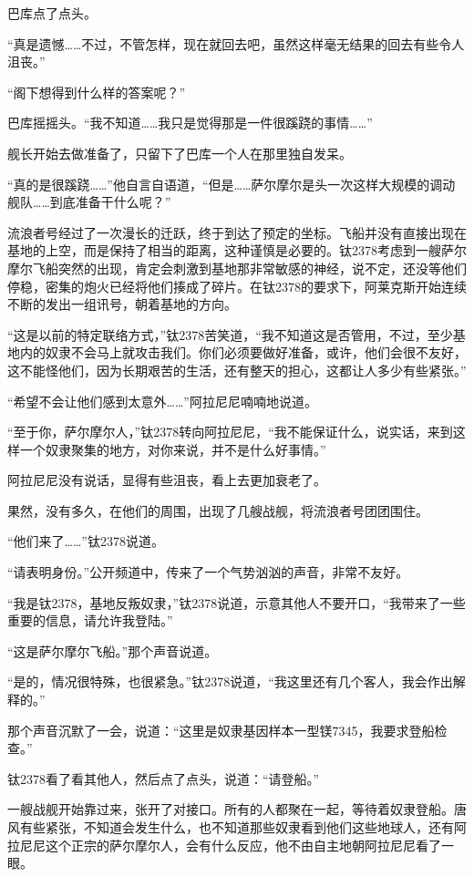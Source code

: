 巴库点了点头。 

“真是遗憾……不过，不管怎样，现在就回去吧，虽然这样毫无结果的回去有些令人沮丧。” 

“阁下想得到什么样的答案呢？” 

巴库摇摇头。“我不知道……我只是觉得那是一件很蹊跷的事情……” 

舰长开始去做准备了，只留下了巴库一个人在那里独自发呆。 

“真的是很蹊跷……”他自言自语道，“但是……萨尔摩尔是头一次这样大规模的调动舰队……到底准备干什么呢？” 

流浪者号经过了一次漫长的迁跃，终于到达了预定的坐标。飞船并没有直接出现在基地的上空，而是保持了相当的距离，这种谨慎是必要的。钛2378考虑到一艘萨尔摩尔飞船突然的出现，肯定会刺激到基地那非常敏感的神经，说不定，还没等他们停稳，密集的炮火已经将他们揍成了碎片。在钛2378的要求下，阿莱克斯开始连续不断的发出一组讯号，朝着基地的方向。 

“这是以前的特定联络方式，”钛2378苦笑道，“我不知道这是否管用，不过，至少基地内的奴隶不会马上就攻击我们。你们必须要做好准备，或许，他们会很不友好，这不能怪他们，因为长期艰苦的生活，还有整天的担心，这都让人多少有些紧张。” 

“希望不会让他们感到太意外……”阿拉尼尼喃喃地说道。 

“至于你，萨尔摩尔人，”钛2378转向阿拉尼尼，“我不能保证什么，说实话，来到这样一个奴隶聚集的地方，对你来说，并不是什么好事情。” 

阿拉尼尼没有说话，显得有些沮丧，看上去更加衰老了。 

果然，没有多久，在他们的周围，出现了几艘战舰，将流浪者号团团围住。 

“他们来了……”钛2378说道。 

“请表明身份。”公开频道中，传来了一个气势汹汹的声音，非常不友好。 

“我是钛2378，基地反叛奴隶，”钛2378说道，示意其他人不要开口，“我带来了一些重要的信息，请允许我登陆。” 

“这是萨尔摩尔飞船。”那个声音说道。 

“是的，情况很特殊，也很紧急。”钛2378说道，“我这里还有几个客人，我会作出解释的。” 

那个声音沉默了一会，说道：“这里是奴隶基因样本一型镁7345，我要求登船检查。” 

钛2378看了看其他人，然后点了点头，说道：“请登船。” 

一艘战舰开始靠过来，张开了对接口。所有的人都聚在一起，等待着奴隶登船。唐风有些紧张，不知道会发生什么，也不知道那些奴隶看到他们这些地球人，还有阿拉尼尼这个正宗的萨尔摩尔人，会有什么反应，他不由自主地朝阿拉尼尼看了一眼。 

